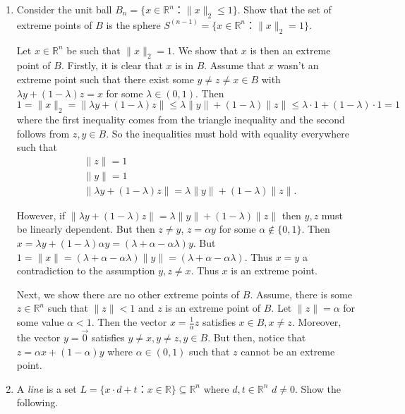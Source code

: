\documentclass[11pt]{article}
\institute{\'Ecole Polytechnique F\'ed\'erale de Lausanne}
\newcommand{\setR}{\mathbb{R}}
\renewcommand{\leq}{\leqslant}
\begin{document}
\makeheader

\begin{enumerate}[1)]

\item  \label{item:ex-9}
  Consider the unit ball $B_n = \{ x ∈ ℝ^n ： \|x\|_2≤1\}$. Show that the set of extreme points of $B$ is the sphere $S^{(n-1)} = \{ x ∈ ℝ^n ： \|x\|_2 =1\}$.
  
  \begin{solution}
  Let $x \in \setR^n$ be such that $\|x\|_2 =1$. We show that $x$ is then an extreme point of $B$. Firstly, it is clear that $x$ is in $B$. 
  Assume that $x$ wasn't an extreme point such that there exist some $y \neq z \neq x \in B$ with $\lambda y + (1-\lambda) z = x$ for some $\lambda \in (0,1)$. Then $$1 = \| x\|_2 = \| \lambda y + (1-\lambda) z \| \leq \lambda \|y\| + (1-\lambda)\|z\| \leq \lambda \cdot 1 + (1-\lambda) \cdot 1 = 1$$
where the first inequality comes from the triangle inequality and the second follows from $z, y \in B$. So the inequalities must hold with equality everywhere such that 
\begin{align}
&\|z\| = 1 \\
&\|y\| = 1\\
&\|\lambda y + (1 - \lambda )z \| =  \lambda \|y\| + (1-\lambda)\|z\|. 
\end{align}

However, if $\|\lambda y + (1 - \lambda )z \| =  \lambda \|y\| + (1-\lambda)\|z\|$ then $y, z$ must be linearly dependent. But then $z \neq y$, $z = \alpha y$ for some $\alpha \notin \{0, 1\}$.  Then $x = \lambda y + (1 - \lambda )\alpha y = (\lambda + \alpha- \alpha \lambda) y$. But $ 1 = \|x\| =(\lambda + \alpha - \alpha \lambda)\|y \| = (\lambda + \alpha - \alpha \lambda)$. Thus $x = y$ a contradiction to the assumption $y, z \neq x$. Thus $x$ is an extreme point. 

Next, we show there are no other extreme points of $B$. Assume, there is some $z \in \setR^n$ such that $\|z\| < 1 $ and $z$ is an extreme point of $B$. Let $\|z\| = \alpha$ for some value $\alpha <1$. Then the vector $x = \frac{1}{\alpha}z$ satisfies $x \in B, x \neq z$. Moreover, the vector $ y = \vec{0} $ satisfies $y \neq x, y \neq z, y \in B$. But then, notice that $z = \alpha x + (1-\alpha) y$ where $\alpha \in (0, 1)$ such that $z$ cannot be an extreme point. 




  \end{solution}
  
  
\item \label{item:10}
  A \emph{line} is a set $L = \{ x ⋅ d +t ： x ∈ ℝ\} ⊆ ℝ^n$ where $d,t ∈ ℝ^n$ $d ≠0$. Show the following.


\end{enumerate}
\end{document}
